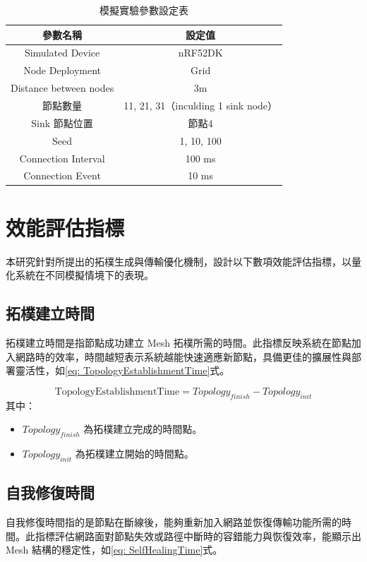 \begin{ZhChapter}
\begin{table}[H]
    \centering
    \caption{模擬實驗參數設定表}
    \label{tab: 模擬實驗參數設定表}
    \begin{tabular}{|c|c|}
        \hline
        參數名稱 & 設定值 \\
        \hline
        Simulated Device & nRF52DK \\
        \hline
        Node Deployment & Grid \\
        \hline
        Distance between nodes & 3m \\
        \hline
        節點數量 & 11, 21, 31（inculding 1 sink node） \\
        \hline
        Sink 節點位置 & 節點4 \\
        \hline
        Seed & 1, 10, 100 \\
        \hline
        Connection Interval & 100 ms \\
        \hline
        Connection Event &  10 ms  \\
        \hline
    \end{tabular}
\end{table}

\section{效能評估指標}
本研究針對所提出的拓樸生成與傳輸優化機制，設計以下數項效能評估指標，以量化系統在不同模擬情境下的表現。

\subsection{拓樸建立時間}
拓樸建立時間是指節點成功建立 Mesh 拓樸所需的時間。此指標反映系統在節點加入網路時的效率，時間越短表示系統越能快速適應新節點，具備更佳的擴展性與部署靈活性，如\ref{eq: TopologyEstablishmentTime}式。

\begin{equation}
\label{eq: TopologyEstablishmentTime}
\text{TopologyEstablishmentTime} = Topology_{finish} - Topology_{init}
\end{equation}
其中：
\begin{itemize}
    \item $Topology_{finish}$ 為拓樸建立完成的時間點。
    \item $Topology_{init}$ 為拓樸建立開始的時間點。
\end{itemize}

\subsection{自我修復時間}
自我修復時間指的是節點在斷線後，能夠重新加入網路並恢復傳輸功能所需的時間。此指標評估網路面對節點失效或路徑中斷時的容錯能力與恢復效率，能顯示出 Mesh 結構的穩定性，如\ref{eq: SelfHealingTime}式。


\end{ZhChapter}
